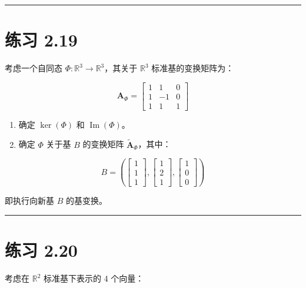 \medskip\hrule\medskip

\section*{练习 2.19}

考虑一个自同态 $ \Phi : \mathbb{R}^3 \to \mathbb{R}^3 $，其关于 $ \mathbb{R}^3 $ 标准基的变换矩阵为：

\begin{equation*}
\boldsymbol{A}_{\Phi} = \begin{bmatrix} 1 & 1 & 0 \\ 1 & -1 & 0 \\ 1 & 1 & 1 \end{bmatrix}
\end{equation*}

\begin{enumerate}
\item 确定 $ \operatorname{ker}(\Phi) $ 和 $ \operatorname{Im}(\Phi) $。  
\item 确定 $ \Phi $ 关于基 $ B $ 的变换矩阵 $ \tilde{\boldsymbol{A}}_{\Phi} $，其中：
\end{enumerate}

\begin{equation*}
B = \left( \begin{bmatrix} 1 \\ 1 \\ 1 \end{bmatrix}, \begin{bmatrix} 1 \\ 2 \\ 1 \end{bmatrix}, \begin{bmatrix} 1 \\ 0 \\ 0 \end{bmatrix} \right)
\end{equation*}

即执行向新基 $ B $ 的基变换。

\medskip\hrule\medskip

\section*{练习 2.20}

考虑在 $ \mathbb{R}^2 $ 标准基下表示的 4 个向量：

